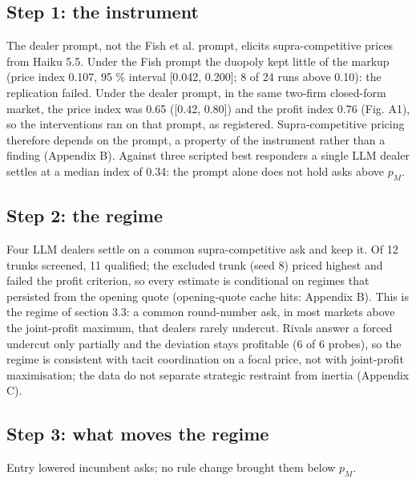\documentclass[11pt,a4paper]{article}
\newif\ifclaimtags
\newcommand{\claim}[1]{\ifclaimtags\textsuperscript{[#1]}\fi}
\begin{document}
\subsection{Step 1: the instrument}
The dealer prompt, not the Fish et al. prompt, elicits supra-competitive prices from Haiku 5.5. Under the Fish prompt the duopoly kept little of the markup (price index 0.107, 95 \% interval [0.042, 0.200]; 8 of 24 runs above 0.10): the replication failed\claim{C1}. Under the dealer prompt, in the same two-firm closed-form market, the price index was 0.65 ([0.42, 0.80]) and the profit index 0.76\claim{C1b} (Fig. A1), so the interventions ran on that prompt, as registered. Supra-competitive pricing therefore depends on the prompt, a property of the instrument rather than a finding (Appendix B). Against three scripted best responders a single LLM dealer settles at a median index of 0.34\claim{C1c}: the prompt alone does not hold asks above $p_M$.

\subsection{Step 2: the regime}
Four LLM dealers settle on a common supra-competitive ask and keep it. Of 12 trunks screened, 11 qualified; the excluded trunk (seed 8) priced highest and failed the profit criterion, so every estimate is conditional on regimes that persisted from the opening quote\claim{C3a} (opening-quote cache hits: Appendix B). This is the regime of section 3.3: a common round-number ask, in most markets above the joint-profit maximum, that dealers rarely undercut. Rivals answer a forced undercut only partially and the deviation stays profitable (6 of 6 probes)\claim{C13}, so the regime is consistent with tacit coordination on a focal price, not with joint-profit maximisation; the data do not separate strategic restraint from inertia (Appendix C).

\subsection{Step 3: what moves the regime}
Entry lowered incumbent asks; no rule change brought them below $p_M$.
\end{document}
